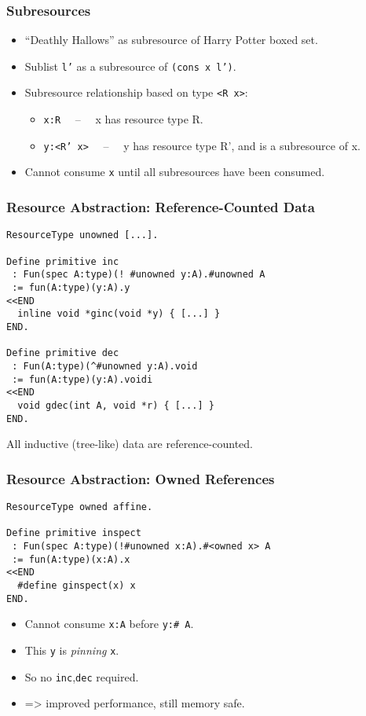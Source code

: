 \documentclass[10pt]{beamer}
\begin{document}
\begin{frame}
\frametitle{Subresources}

\begin{itemize}
\item ``Deathly Hallows'' as subresource of Harry Potter boxed set.
\item Sublist \texttt{l'} as a subresource of \texttt{(cons x l')}.
\item Subresource relationship based on type \texttt{<R x>}:
\begin{itemize}
\item \texttt{x:R} \ \ -- \ \ x has resource type R.
\item \texttt{y:<R' x>} \ \ -- \ \  y has resource type R', and is a subresource of x.
\end{itemize}

\item Cannot consume \texttt{x} until all subresources have been consumed.

\end{itemize}

\end{frame}

\begin{frame}[containsverbatim]
\frametitle{Resource Abstraction: Reference-Counted Data}
{
\footnotesize
\begin{verbatim}
ResourceType unowned [...].

Define primitive inc
 : Fun(spec A:type)(! #unowned y:A).#unowned A
 := fun(A:type)(y:A).y 
<<END
  inline void *ginc(void *y) { [...] }
END.

Define primitive dec
 : Fun(A:type)(^#unowned y:A).void
 := fun(A:type)(y:A).voidi 
<<END
  void gdec(int A, void *r) { [...] }
END.
\end{verbatim}
}

All inductive (tree-like) data are reference-counted.
\end{frame}


\begin{frame}[containsverbatim]
\frametitle{Resource Abstraction: Owned References}
\footnotesize
\begin{verbatim}
ResourceType owned affine.

Define primitive inspect
 : Fun(spec A:type)(!#unowned x:A).#<owned x> A 
 := fun(A:type)(x:A).x
<<END
  #define ginspect(x) x
END.
\end{verbatim}

\begin{itemize}
\item Cannot consume \texttt{x:A} before \texttt{y:\#<owned x> A}.
\item This \texttt{y} is \emph{pinning} \texttt{x}.
\item So no \texttt{inc},\texttt{dec} required.
\item => improved performance, still memory safe.
\end{itemize}

\end{frame}
\end{document}

